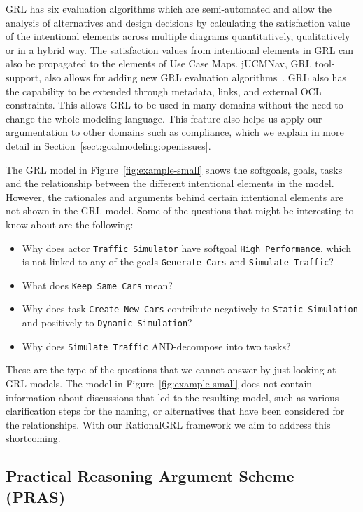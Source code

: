 GRL has six evaluation algorithms which are semi-automated and allow the analysis of alternatives and design decisions by calculating the satisfaction value of the intentional elements across multiple diagrams quantitatively, qualitatively or in a hybrid way. The satisfaction values from intentional elements in GRL can also be propagated to the elements of Use Case Maps. jUCMNav, GRL tool-support, also allows for adding new GRL evaluation algorithms~\cite{jUCMNav}. GRL also has the capability to be extended through metadata, links, and external OCL constraints. This allows GRL to be used in many domains without the need to change the whole modeling language. This feature also helps us apply our argumentation to other domains such as compliance, which we explain in more detail in Section~\ref{sect:goalmodeling:openissues}.

The GRL model in Figure~\ref{fig:example-small} shows the softgoals, goals, tasks and the relationship between the different intentional elements in the model. However, the rationales and arguments behind certain intentional elements are not shown in the GRL model. Some of the questions that might be interesting to know about are the following:

\begin{itemize}
	\item Why does actor \texttt{Traffic Simulator} have softgoal \texttt{High Performance}, which is not linked to any of the goals \texttt{Generate Cars} and \texttt{Simulate Traffic}? %
	\item What does \texttt{Keep Same Cars} mean?
	\item Why does task \texttt{Create New Cars} contribute negatively to \texttt{Static Simulation} and positively to \texttt{Dynamic Simulation}?
	\item Why does \texttt{Simulate Traffic} AND-decompose into two tasks?
\end{itemize}

These are the type of the questions that we cannot answer by just looking at GRL models. The model in Figure~\ref{fig:example-small} does not contain information about discussions that led to the resulting model, such as various clarification steps for the naming, or alternatives that have been considered for the relationships. With our RationalGRL framework we aim to address this shortcoming.

\subsection{Practical Reasoning Argument Scheme (PRAS)}
\label{sect:background:pras}

